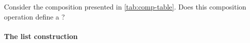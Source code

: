 %

\begin{gradedexercise}
    \label{ex:CompositionTable}
    Consider the composition presented in \cref{tab:comp-table}.
    Does this composition operation define a ?
\end{gradedexercise}


\paragraph{The list construction}


